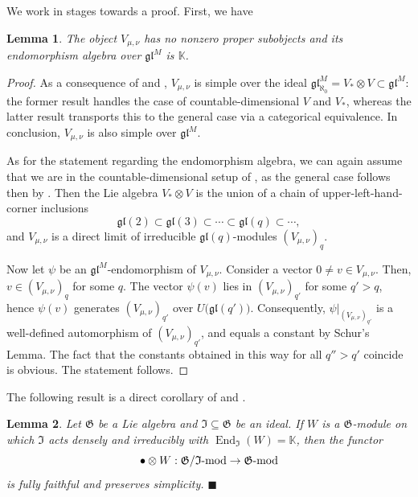 \documentclass[11pt]{article}
\theoremstyle{plain}
\newtheorem{lemma}{Lemma}[section]
\theoremstyle{nonumberplain}
\theoremstyle{plain}
\theoremstyle{nonumberplain}
\newtheorem{proof}{Proof}
\newcommand\bK{\mathbb K}
\newcommand\fG{\mathfrak{G}}
\newcommand\fgl{\mathfrak{gl}}
\DeclareMathOperator{\End}{\mathrm{End}}
\newcommand{\qedhere}{\mbox{}\hfill\ensuremath{\blacksquare}}
\begin{document}
We work in stages towards a proof. First, we have 



\begin{lemma}
  The object $V_{\mu,\nu}$ has no nonzero proper subobjects and its
  endomorphism algebra over $\fgl^M$ is $\bK$.  
\end{lemma}
\begin{proof}
  As a consequence of \cite[Theorem 2.2]{PS} and \cite[Theorem
  5.5]{PS2}, $V_{\mu,\nu}$ is simple over the ideal
  $\fgl^M_{\aleph_0}=V_*\otimes V\subset \fgl^M$: the former result handles the case of
  countable-dimensional $V$ and $V_*$, whereas the latter result transports
  this to the general case via a categorical equivalence. In
  conclusion, $V_{\mu,\nu}$ is also simple over $\fgl^M$.

  As for the statement regarding the endomorphism algebra, we can
  again assume that we are in the countable-dimensional setup of
  \cite{PS}, as the general case follows then by \cite[Theorem
  5.5]{PS2}.  Then the Lie algebra $V_*\otimes V$ is the union of a chain of
  upper-left-hand-corner inclusions
  \begin{equation*}
    \fgl(2)\subset \fgl(3)\subset \cdots\subset \fgl(q)\subset\cdots,
  \end{equation*}
  and $V_{\mu,\nu}$ is a direct limit of irreducible
  $\fgl(q)$-modules $\left(V_{\mu,\nu}\right)_q$.
  
  Now let $\psi$ be an $\fgl^M$-endomorphism of $V_{\mu,\nu}$.  Consider a vector $0\neq v\in V_{\mu,\nu}$.  Then, $v\in \left(V_{\mu,\nu}\right)_q$ for some $q$.  The vector $\psi(v)$ lies in $\left(V_{\mu,\nu}\right)_{q'}$ for some $q'>q$, hence $\psi(v)$ generates $\left(V_{\mu,\nu}\right)_{q'}$ over $U\big(\fgl(q')\big)$.  Consequently, $\psi|_{\left(V_{\mu,\nu}\right)_{q'}}$ is a well-defined automorphism of $\left(V_{\mu,\nu}\right)_{q'}$, and equals a constant by Schur's Lemma.  The fact that the constants obtained in this way for all $q''>q'$ coincide is obvious.  The statement follows.
\end{proof}









The following result is a direct corollary of \cite[Lemma 3]{Chi14} and \cite[Lemma 3.1]{us2}.


\begin{lemma}\label{le.simple_aux}
Let $\fG$ be a Lie algebra and $\mathfrak{I} \subseteq \fG$ {be} an ideal. If $W$ is a $\fG$-module on which $\mathfrak{I} $ acts densely and irreducibly with $\End_\mathfrak{I} (W)=\bK$, then the functor 
\begin{equation*}
  \bullet\otimes W: {\fG/\mathfrak{I}\textup{-mod}}\to {\fG\textup{-mod}}
\end{equation*}
is fully faithful and preserves simplicity. 
  \qedhere
\end{lemma}
\end{document}
